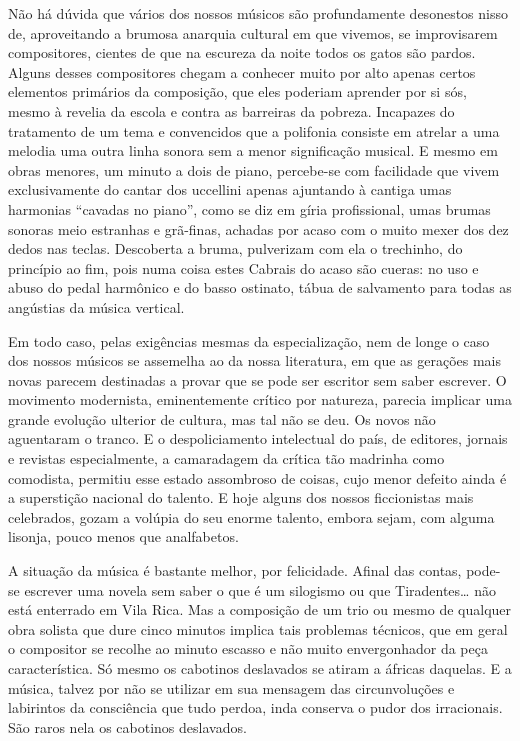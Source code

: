 Não há dúvida que vários dos nossos músicos são profundamente desonestos
nisso de, aproveitando a brumosa anarquia cultural em que vivemos, se
improvisarem compositores, cientes de que na escureza da noite todos os
gatos são pardos. Alguns desses compositores chegam a conhecer muito por
alto apenas certos elementos primários da composição, que eles poderiam
aprender por si sós, mesmo à revelia da escola e contra as barreiras da
pobreza. Incapazes do tratamento de um tema e convencidos que a
polifonia consiste em atrelar a uma melodia uma outra linha sonora sem a
menor significação musical. E mesmo em obras menores, um minuto a dois
de piano, percebe-se com facilidade que vivem exclusivamente do cantar
dos uccellini apenas ajuntando à cantiga umas harmonias ``cavadas no
piano'', como se diz em gíria profissional, umas brumas sonoras meio
estranhas e grã-finas, achadas por acaso com o muito mexer dos dez dedos
nas teclas. Descoberta a bruma, pulverizam com ela o trechinho, do
princípio ao fim, pois numa coisa estes Cabrais do acaso são cueras: no
uso e abuso do pedal harmônico e do basso ostinato, tábua de salvamento
para todas as angústias da música vertical.

Em todo caso, pelas exigências mesmas da especialização, nem de longe o
caso dos nossos músicos se assemelha ao da nossa literatura, em que as
gerações mais novas parecem destinadas a provar que se pode ser escritor
sem saber escrever. O movimento modernista, eminentemente crítico por
natureza, parecia implicar uma grande evolução ulterior de cultura, mas
tal não se deu. Os novos não aguentaram o tranco. E o despoliciamento
intelectual do país, de editores, jornais e revistas especialmente, a
camaradagem da crítica tão madrinha como comodista, permitiu esse estado
assombroso de coisas, cujo menor defeito ainda é a superstição nacional
do talento. E hoje alguns dos nossos ficcionistas mais celebrados, gozam
a volúpia do seu enorme talento, embora sejam, com alguma lisonja, pouco
menos que analfabetos.

A situação da música é bastante melhor, por felicidade. Afinal das
contas, pode-se escrever uma novela sem saber o que é um silogismo ou
que Tiradentes\ldots{} não está enterrado em Vila Rica. Mas a composição de
um trio ou mesmo de qualquer obra solista que dure cinco minutos implica
tais problemas técnicos, que em geral o compositor se recolhe ao minuto
escasso e não muito envergonhador da peça característica. Só mesmo os
cabotinos deslavados se atiram a áfricas daquelas. E a música, talvez
por não se utilizar em sua mensagem das circunvoluções e labirintos da
consciência que tudo perdoa, inda conserva o pudor dos irracionais. São
raros nela os cabotinos deslavados.

